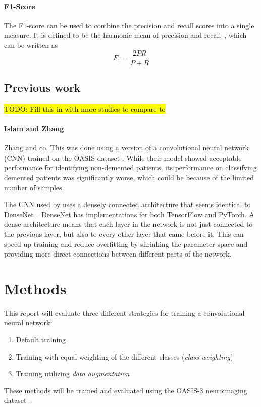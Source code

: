 \documentclass{kththesis}
\begin{document}
\subsubsection{F1-Score}
The F1-score can be used to combine the precision and recall scores into a single measure. It is defined to be the harmonic mean of precision and recall~\cite[p.~156-167]{irbook}, which can be written as
\[ F_1 = \frac{2PR}{P + R} \]

\section{Previous work}
\hl{TODO: Fill this in with more studies to compare to}
\subsubsection{Islam and Zhang}
Zhang and co.
This was done using a version of a convolutional neural network (CNN) trained on the OASIS dataset \parencite{oasis}. While their model showed acceptable performance for identifying non-demented patients, its performance on classifying demented patients was significantly worse, which could be because of the limited number of samples.

The CNN used by \textcite{islam2018early} uses a densely connected architecture that seems identical to DenseNet~\cite{huang2017densely}. DenseNet has implementations for both TensorFlow and PyTorch. A dense architecture means that each layer in the network is not just connected to the previous layer, but also to every other layer that came before it. This can speed up training and reduce overfitting by shrinking the parameter space and providing more direct connections between different parts of the network.

\chapter{Methods}
This report will evaluate three different strategies for training a convolutional neural network:
\begin{enumerate}
  \item Default training
  \item Training with equal weighting of the different classes (\textit{class-weighting})
  \item Training utilizing \textit{data augmentation}
\end{enumerate}

These methods will be trained and evaluated using the OASIS-3 neuroimaging dataset~\cite{oasis}.
\end{document}
